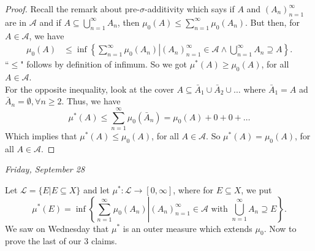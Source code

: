 \documentclass[letterpaper, 12pt]{article}
\newcommand{\cL}{\mathcal{L}}
\newcommand{\sA}{\mathcal{A}}
\theoremstyle{stdthm}
\theoremstyle{stddef}
\theoremstyle{stdnonum}
\theoremstyle{stdqands}
\theoremstyle{stdbold}
\begin{document}
\begin{proof}
Recall the remark about pre-$\sigma$-additivity which says if $A$ and $(A_n)_{n=1}^\infty$ are in $\sA$ and if $A \subseteq \bigcup_{n=1}^\infty A_n$, then $\mu_0(A) \leq \sum_{n=1}^\infty \mu_0(A_n)$. But then, for $A \in \sA$, we have 
\begin{align*}
\mu_0(A) &\leq \inf \left.\left \{ \sum_{n=1}^\infty \mu_0(A_n)\right| (A_n)_{n=1}^\infty \in \sA \wedge \bigcup_{n=1}^\infty A_n \supseteq A \right\}.
\end{align*}
``$\leq$" follows by definition of infimum. So we got $\mu^*(A) \geq \mu_0(A)$, for all $A \in \sA$.\\

For the opposite inequality, look at the cover $A \subseteq \bar{A}_1 \cup \bar{A}_2\cup  \dots$ where $\bar{A}_1 = A$ ad $\bar{A}_n = \emptyset, \forall n\geq 2$. Thus, we have 
\[\mu^*(A) \leq \sum_{n=1}^\infty \mu_0(\bar{A}_n) = \mu_0(A) + 0 + 0 + \dots  \]
Which implies that $\mu^*(A) \leq \mu_0(A)$, for all $A \in \sA$. So $\mu^*(A) = \mu_0(A)$, for all $A \in \sA$.
\end{proof}

\begin{center}
\emph{Friday, September 28}
\end{center}

Let $\cL = \{E|E\subseteq X\}$ and let $\mu^*: \cL \rightarrow [0,\infty]$, where for $E \subseteq X$, we put
\[ \mu^*(E) = \inf \left.\left\{ \sum_{n=1}^\infty \mu_0 (A_n)\right| (A_n)_{n=1}^\infty \in \sA \text{ with } \bigcup_{n=1}^\infty A_n \supseteq E \right\}.\]
We saw on Wednesday that $\mu^*$ is an outer measure which extends $\mu_0$. Now to prove the last of our 3 claims.
\end{document}
